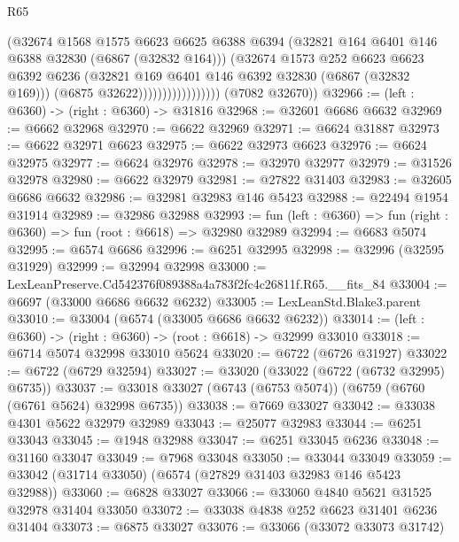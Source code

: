 \begin{lexlean}{R65}
\begin{coremodule}
{                                  (@32674
                                    @1568
                                    @1575
                                    @6623
                                    @6625
                                    @6388
                                    @6394
                                    (@32821 @164 @6401 @146 @6388 @32830 (@6867 (@32832 @164)))
                                    (@32674
                                      @1573
                                      @252
                                      @6623
                                      @6623
                                      @6392
                                      @6236
                                      (@32821 @169 @6401 @146 @6392 @32830 (@6867 (@32832 @169)))
                                      (@6875 @32622)))))))))))))))))
      (@7082 @32670))
@32966 := (left : @6360) -> (right : @6360) -> @31816
@32968 := @32601 @6686 @6632
@32969 := @6662 @32968
@32970 := @6622 @32969
@32971 := @6624 @31887
@32973 := @6622 @32971 @6623
@32975 := @6622 @32973 @6623
@32976 := @6624 @32975
@32977 := @6624 @32976
@32978 := @32970 @32977
@32979 := @31526 @32978
@32980 := @6622 @32979
@32981 := @27822 @31403
@32983 := @32605 @6686 @6632
@32986 := @32981 @32983 @146 @5423
@32988 := @22494 @1954 @31914
@32989 := @32986 @32988
@32993 := fun (left : @6360) => fun (right : @6360) => fun (root : @6618) => @32980 @32989
@32994 := @6683 @5074
@32995 := @6574 @6686
@32996 := @6251 @32995
@32998 := @32996 (@32595 @31929)
@32999 := @32994 @32998
@33000 := LexLeanPreserve.Cd542376f089388a4a783f2fc4c26811f.R65.__fits_84
@33004 := @6697 (@33000 @6686 @6632 @6232)
@33005 := LexLeanStd.Blake3.parent
@33010 := @33004 (@6574 (@33005 @6686 @6632 @6232))
@33014 := (left : @6360) -> (right : @6360) -> (root : @6618) -> @32999 @33010
@33018 := @6714 @5074 @32998 @33010 @5624
@33020 := @6722 (@6726 @31927)
@33022 := @6722 (@6729 @32594)
@33027 := @33020 (@33022 (@6722 (@6732 @32995) @6735))
@33037 := @33018 @33027 (@6743 (@6753 @5074)) (@6759 (@6760 (@6761 @5624) @32998 @6735))
@33038 := @7669 @33027
@33042 := @33038 @4301 @5622 @32979 @32989
@33043 := @25077 @32983
@33044 := @6251 @33043
@33045 := @1948 @32988
@33047 := @6251 @33045 @6236
@33048 := @31160 @33047
@33049 := @7968 @33048
@33050 := @33044 @33049
@33059 := @33042 (@31714 @33050) (@6574 (@27829 @31403 @32983 @146 @5423 @32988))
@33060 := @6828 @33027
@33066 := @33060 @4840 @5621 @31525 @32978 @31404 @33050
@33072 := @33038 @4838 @252 @6623 @31401 @6236 @31404
@33073 := @6875 @33027
@33076 := @33066 (@33072 @33073 @31742)
}
\end{coremodule}
\end{lexlean}
